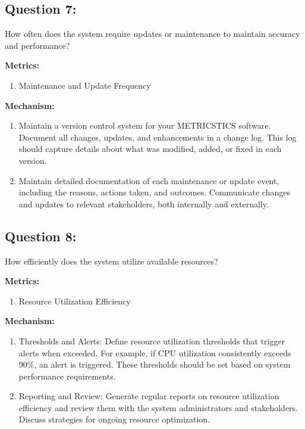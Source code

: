 \documentclass[12pt,letterpaper]{report}
\begin{document}
\subsection*{Question 7:} How often does the system require updates or maintenance to maintain accuracy and performance?

\item \textbf{Metrics:}

\begin{enumerate}
        \item Maintenance and Update Frequency
\end{enumerate}

\item \textbf{Mechanism:}
\begin{enumerate}
        \item Maintain a version control system for your METRICSTICS software. Document all changes, updates, and enhancements in a change log. This log should capture details about what was modified, added, or fixed in each version.

        \item Maintain detailed documentation of each maintenance or update event, including the reasons, actions taken, and outcomes. Communicate changes and updates to relevant stakeholders, both internally and externally.
\end{enumerate}

\subsection*{Question 8:} How efficiently does the system utilize available resources?

\item \textbf{Metrics:} 

\begin{enumerate}
        \item Resource Utilization Efficiency
\end{enumerate}

\item \textbf{Mechanism:}
\begin{enumerate}
        \item Thresholds and Alerts: Define resource utilization thresholds that trigger alerts when exceeded. For example, if CPU utilization consistently exceeds 90\%, an alert is triggered. These thresholds should be set based on system performance requirements.

        \item Reporting and Review: Generate regular reports on resource utilization efficiency and review them with the system administrators and stakeholders. Discuss strategies for ongoing resource optimization.
\end{enumerate}
\end{document}

